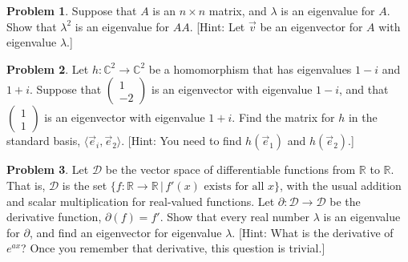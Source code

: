 \documentclass[11pt]{article}
\newcommand{\R}{{\mathbb R}}
\newcommand{\C}{{\mathbb C}}
\theoremstyle{definition}
\newtheorem{problem}{Problem}
\newenvironment{answer}{\par\bigskip\bgroup\color{darkblue}}{\egroup}
\begin{document}
\begin{answer}
\end{answer}



\begin{problem} %
Suppose that $A$ is an $n\times n$ matrix, and $\lambda$ is an eigenvalue for $A$.
Show that $\lambda^2$ is an eigenvalue for $AA$.  [Hint:  Let $\vec v$ be an
eigenvector for $A$ with eigenvalue $\lambda$.]
\end{problem}

\begin{answer}
\end{answer}



\begin{problem} %
Let $h\colon \C^2\to\C^2$ be a homomorphism that has eigenvalues $1-i$ and $1+i$.
Suppose that $\begin{pmatrix} 1\\ -2 \end{pmatrix}$ is an eigenvector with eigenvalue $1-i$,
and that $\begin{pmatrix} 1\\ 1\end{pmatrix}$ is an eigenvector with eigenvalue $1+i$.
Find the matrix for $h$ in the standard basis, $\langle\vec e_i,\vec e_2\rangle$.
[Hint:  You need to find $h(\vec e_1)$ and $h(\vec e_2)$.]
\end{problem}

\begin{answer}
\end{answer}



\begin{problem} %
Let ${\mathscr D}$ be the vector space of differentiable functions
from $\R$ to $\R$.  That is, ${\mathscr D}$ is the set $\{f\colon \R\to\R\,|\, f'(x)\text{ exists for all }x\}$,
with the usual addition and scalar multiplication for real-valued functions.
Let $\partial\colon{\mathscr D}\to{\mathscr D}$ be the derivative function,
$\partial(f)=f'$.  Show that every real number $\lambda$ is an eigenvalue for $\partial$,
and find an eigenvector for eigenvalue $\lambda$.  [Hint: What is the derivative of $e^{ax}$? Once you
remember that derivative, this question is trivial.]

\end{problem}

\begin{answer}
\end{answer}
\end{document}
